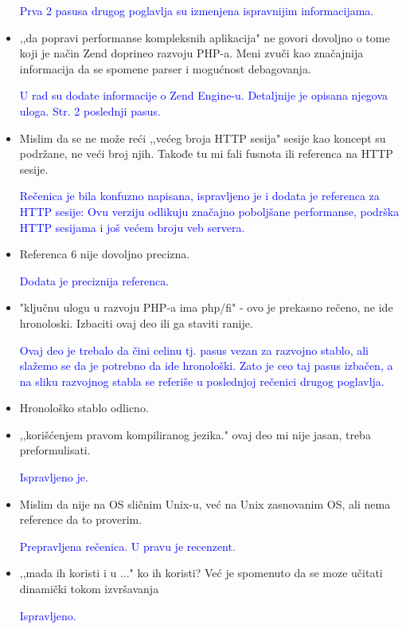 \documentclass[a4paper]{report}
\newcommand{\odgovor}[1]{\textcolor{blue}{#1}}
\begin{document}
\begin{itemize}
\odgovor{Prva 2 pasusa drugog poglavlja su izmenjena ispravnijim informacijama.}

\item ,,da popravi performanse kompleksnih aplikacija" ne govori dovoljno o tome koji je način Zend doprineo razvoju PHP-a. Meni zvuči kao značajnija informacija da se spomene parser i mogućnost debagovanja.

\odgovor{U rad su dodate informacije o Zend Engine-u. Detaljnije je opisana njegova uloga. Str. 2 poslednji pasus.}

\item Mislim da se ne može reći ,,većeg broja HTTP sesija" sesije kao koncept su podržane, ne veći broj njih. Takođe tu mi fali fusnota ili referenca na HTTP sesije.

\odgovor{Rečenica je bila konfuzno napisana, ispravljeno je i dodata je referenca za HTTP sesije: Ovu verziju odlikuju značajno poboljšane performanse, podrška HTTP sesijama \cite{httpsession} i još većem broju veb servera.}

\item Referenca 6 nije dovoljno precizna.

\odgovor{Dodata je preciznija referenca.}

\item "ključnu ulogu u razvoju PHP-a ima php/fi" - ovo je prekasno rečeno, ne ide hronoloski. Izbaciti ovaj deo ili ga staviti ranije.

\odgovor{Ovaj deo je trebalo da čini celinu tj. pasus vezan za razvojno stablo, ali slažemo se da je potrebno da ide hronološki. Zato je ceo taj pasus izbačen, a na sliku razvojnog stabla se referiše u poslednjoj rečenici drugog poglavlja.}

\item Hronološko stablo odlicno.
\item ,,korišćenjem pravom kompiliranog jezika." ovaj deo mi nije jasan, treba preformulisati.

\odgovor{Ispravljeno je.}

\item Mislim da nije na OS sličnim Unix-u, već na Unix zasnovanim OS, ali nema reference da to proverim.

\odgovor{Prepravljena rečenica. U pravu je recenzent.}

\item ,,mada ih koristi i u ..." ko ih koristi? Već je spomenuto da se moze učitati dinamički tokom izvršavanja

\odgovor{Ispravljeno.}


\end{itemize}
\end{document}
